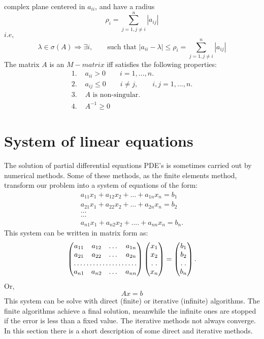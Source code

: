 \documentclass[a4paper,10pt]{report}
\begin{document}
complex plane centered in $a_{ii}$, and have a radius
\begin{equation*}
 \rho_i=\sum_{j=1,j\neq i}^n |a_{ij}|
\end{equation*}
$i.e,$
\begin{equation*}
 \lambda \in \sigma (A) \Rightarrow \exists i,\qquad \text{such that } |a_{ii}-\lambda|\leq \rho_i=\sum_{j=1,j\neq i}^n |a_{ij}|
\end{equation*}
The matrix $A$ is an $M-matrix$ iff satisfies the following properties:
\begin{align*}
\text{1. } &a_{ii}>0 \qquad i=1,...,n. \\
\text{2. }&a_{ij} \leq 0 \qquad i\neq j, \qquad i, j=1,...,n. \\
\text{3. }& A \text{ is non-singular.}\\
\text{4. }&A^{-1} \geq 0
\end{align*}
\chapter{System of linear equations}
The solution of partial differential equations PDE's is sometimes carried out by numerical methods.
Some of these methods, as the finite elements method, transform our problem into a system of equations of the form:
\begin{gather*}
a_{11}x_{1}+a_{12}x_{2}+\dots+a_{1n}x_{n}=b_{1}\\
a_{21}x_{1}+a_{22}x_{2}+\dots+a_{2n}x_{n}=b_{2}\\
\dots\\
\dots\\
a_{n1}x_{1}+a_{n2}x_{2}+....+a_{nn}x_{n}=b_{n}.
\end{gather*}
This system can be written in matrix form as:
\begin{equation*}
\begin{pmatrix}
a_{11} & a_{12} & \dots & a_{1n}\\
a_{21} & a_{22} & \dots & a_{2n}\\
\hdotsfor{4}\\
a_{n1} & a_{n2} & \dots &a_{nn}
\end{pmatrix}
\begin{pmatrix}
x_{1}\\
x_{2}\\
\hdotsfor{1}\\
x_{n}
\end{pmatrix}
=
\begin{pmatrix}
b_{1}\\
b_{2}\\
\hdotsfor{1}\\
b_{n}
\end{pmatrix}.
\end{equation*}
Or,
\begin{equation}\label{ls}
Ax=b
\end{equation}
This system can be solve with direct (finite) or iterative (infinite) algorithms. The finite algorithms achieve a final solution, meanwhile the infinite ones
are stopped if the error is less than a fixed value. The iterative methods not always converge.
In this section there is a short description of some direct and iterative methods.
\end{document}

